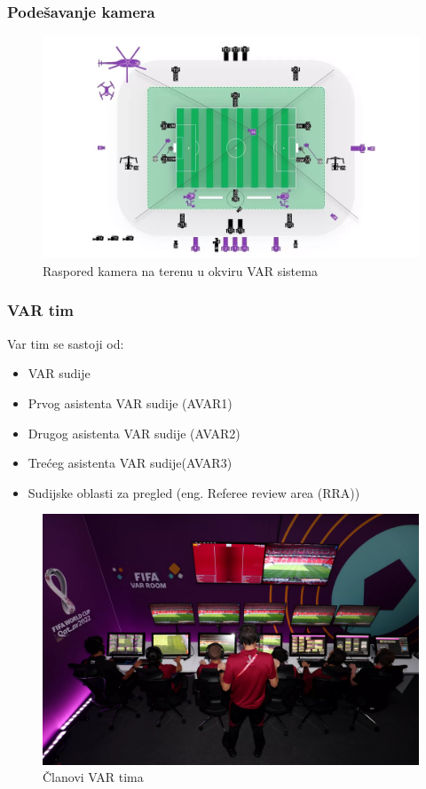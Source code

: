 \documentclass{beamer}
\begin{document}
\begin{frame}
  \frametitle{Podešavanje kamera}
    \begin{figure}[h!]
    \begin{center}
    \includegraphics[scale=0.30]{Var sistem.jpeg}
    \end{center}
    \caption{Raspored kamera na terenu u okviru VAR sistema}
    \label{fig:kamere}
\end{figure}
\end{frame}
\begin{frame}
  \frametitle{VAR tim}
  Var tim se sastoji od:
    \begin{itemize}
    
        \item VAR sudije
        \item Prvog asistenta VAR sudije (AVAR1)
        \item Drugog asistenta VAR sudije (AVAR2)
        \item Trećeg asistenta VAR sudije(AVAR3)
        \item Sudijske oblasti za pregled (eng. Referee review area (RRA))
    \end{itemize}
    \begin{figure}[h!]
    \begin{center}
    \includegraphics[scale=0.10]{var.png}
    \end{center}
    \caption{Članovi VAR tima}
    \label{fig:vartim}
\end{figure}
\end{frame}
\end{document}
